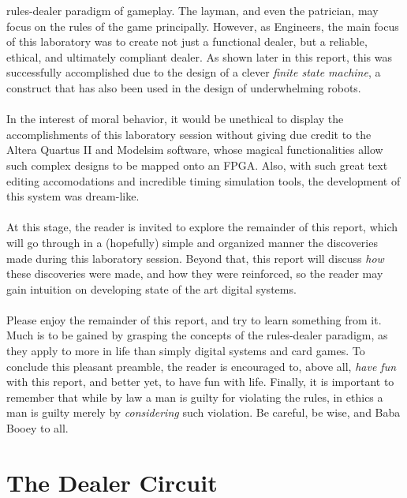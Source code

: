 \documentclass[12pt]{report}
\begin{document}
rules-dealer paradigm of gameplay. The layman, and even the patrician, may focus on the rules of the
game principally. However, as Engineers, the main focus of this laboratory was to create not just a
functional dealer, but a reliable, ethical, and ultimately compliant dealer. As shown later in this
report, this was successfully accomplished due to the design of a clever \textit{finite state
machine}, a construct that has also been used in the design of underwhelming robots.\\\\
In the interest of moral behavior, it would be unethical to display the accomplishments of this
laboratory session without giving due credit to the Altera Quartus II and Modelsim software, whose
magical functionalities allow such complex designs to be mapped onto an FPGA. Also, with such great
text editing accomodations and incredible timing simulation tools, the development of this system
was dream-like.\\\\
At this stage, the reader is invited to explore the remainder of this report, which will go through
in a (hopefully) simple and organized manner the discoveries made during this laboratory session.
Beyond that, this report will discuss \textit{how} these discoveries were made, and how they were
reinforced, so the reader may gain intuition on developing state of the art digital systems.\\\\
Please enjoy the remainder of this report, and try to learn something from it. Much is to be gained
by grasping the concepts of the rules-dealer paradigm, as they apply to more in life than simply
digital systems and card games. To conclude this pleasant preamble, the reader is encouraged to,
above all, \textit{have fun} with this report, and better yet, to have fun with life. Finally, it is
important to remember that while by law a man is guilty for violating the rules, in ethics a man is
guilty merely by \textit{considering} such violation. Be careful, be wise, and Baba Booey to all.

\part{The Dealer Circuit}
\end{document}
